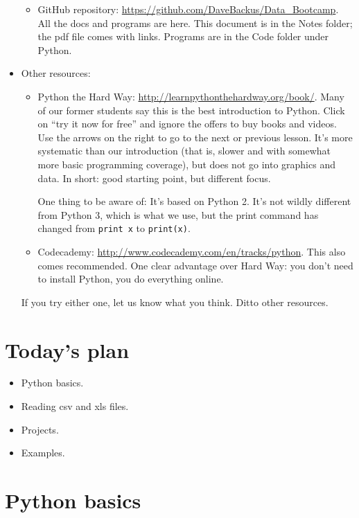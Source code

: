 \documentclass[11pt]{article}
\begin{document}
\begin{itemize}
\begin{itemize}
\item GitHub repository:  \url{https://github.com/DaveBackus/Data_Bootcamp}.
All the docs and programs are here.  
This document is in the Notes folder;
the pdf file comes with links.  
Programs are in the Code folder under Python.
\end{itemize}

\item Other resources:  
%
\begin{itemize} 
\item {Python the Hard Way}:  \url{http://learnpythonthehardway.org/book/}.
Many of our former students say this is the best introduction to Python.
Click on ``try it now for free'' and ignore the offers to buy books and videos.
Use the arrows on the right to go to the next or previous lesson. 
It's more systematic than our introduction 
(that is, slower and with somewhat more basic programming coverage), 
but does not go into graphics and data.
In short:  good starting point, but different focus.  

One thing to be aware of:  It's based on Python 2.
It's not wildly different from Python 3, which is what we use,
but the print command has changed from {\tt print x} to {\tt print(x)}.

\item Codecademy:  \url{http://www.codecademy.com/en/tracks/python}.
This also comes recommended.
One clear advantage over Hard Way:  you don't need to install Python, 
you do everything online.  
\end{itemize}
If you try either one, let us know what you think.  Ditto other resources.  
\end{itemize}


\section{Today's plan}

\begin{itemize}
\item Python basics.
\item Reading csv and xls files.
\item Projects.
\item Examples.
\end{itemize}

\section{Python basics}
\end{document}
